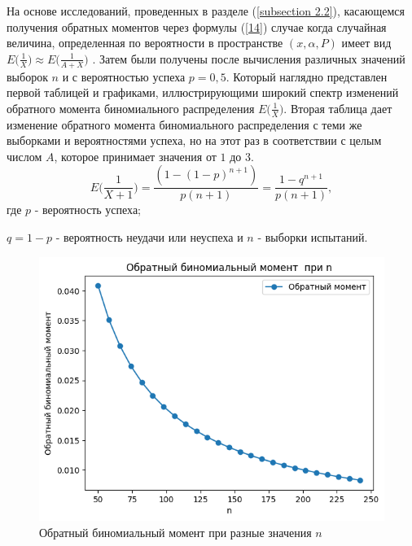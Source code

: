 \documentclass[13pt]{article}
\begin{document}
На основе исследований, проведенных в разделе (\ref{subsection 2.2}), касающемся получения обратных моментов через формулы (\ref{14}) случае когда случайная величина, определенная по вероятности в пространстве $(x,\alpha,P)$ имеет вид $E\big(\frac{1}{X}\big) \approx E\big(\frac{1}{A + X}\big)$ . Затем были получены  после вычисления различных значений выборок $n$ и с вероятностью успеха $p=0,5$. Который наглядно представлен первой таблицей и графиками, иллюстрирующими широкий спектр изменений обратного момента биномиального распределения $E\big(\frac{1}{X}\big)$. Вторая таблица дает изменение обратного момента биномиального распределения с теми же выборками и вероятностями успеха, но на этот раз в соответствии с целым числом $A$, которое принимает значения от $1$ до $3$.
\begin{equation*}
     E\bigg(\frac{1}{X+1}\bigg)=\frac{(1-(1-p)^{n+1})}{p(n+1)}=\frac{1-q^{n+1}}{p(n+1)}, 
\end{equation*}
где $p$ - вероятность успеха;\par
$q=1-p$ - вероятность неудачи или неуспеха и $n$ - выборки испытаний.
\vspace{6 mm}
\begin{figure}[htp]
    \centering
    \includegraphics[width=12cm]{images/moment_inverse_bino.png}
    \caption{ Обратный биномиальный момент при разные значения $n$ }
    \label{binom_fig}
\end{figure}


\end{document}
